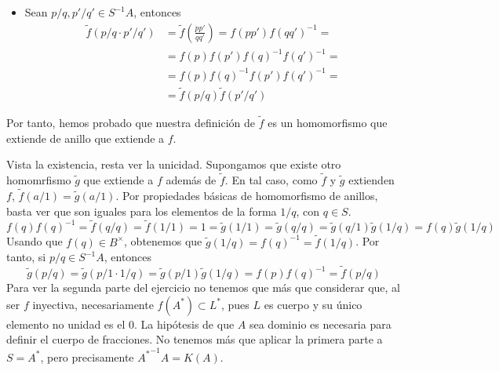 \documentclass[twoside]{article}
\begin{document}
\begin{ejercicio}{1}
\begin{solucion}
\begin{itemize}
\begin{itemize}
\item Sean $p/q,p'/q' \in S^{-1}A$, entonces
\begin{align*}
\tilde{f}(p/q\cdot p'/q') &= 	\tilde{f}\left(\frac{pp'}{qq'}\right) = f(pp')f(qq')^{-1} = \\
 &= f(p)f(p')f(q)^{-1}f(q')^{-1} = \\
 &= f(p)f(q)^{-1}f(p')f(q')^{-1} =\\
 &= \tilde{f}(p/q)\tilde{f}(p'/q')
\end{align*}
\end{itemize}
Por tanto, hemos probado que nuestra definición de $\tilde{f}$ es un homomorfismo que extiende de anillo que extiende a $f$.
\end{itemize}
Vista la existencia, resta ver la unicidad. Supongamos que existe otro homomrfismo $\tilde{g}$ que extiende a $f$ además de $\tilde{f}$. En tal caso, como $\tilde{f}$ y $\tilde{g}$ extienden $f$, $\tilde{f}(a/1)=\tilde{g}(a/1)$. Por propiedades básicas de homomorfismo de anillos, basta ver que son iguales para los elementos de la forma $1/q$, con $q\in S$.
$$
f(q)f(q)^{-1} = \tilde{f}(q/q)= \tilde{f}(1/1) = 1 =\tilde{g}(1/1) =\tilde{g}(q/q) =\tilde{g}(q/1)\tilde{g}(1/q)=f(q)\tilde{g}(1/q)
$$
Usando que $f(q)\in B^\times$, obtenemos que $\tilde{g}(1/q)=f(q)^{-1}=\tilde{f}(1/q)$. Por tanto, si ${p/q\in S^{-1}A}$, entonces 
$$
\tilde{g}(p/q) = \tilde{g}(p/1\cdot 1/q) = \tilde{g}(p/1)\tilde{g}(1/q) = f(p)f(q)^{-1} = \tilde{f}(p/q)
$$
Para ver la segunda parte del ejercicio no tenemos que más que considerar que, al ser $f$ inyectiva, necesariamente $f(A^*)\subset L^*$, pues $L$ es cuerpo y su único elemento no unidad es el $0$. La hipótesis de que $A$ sea dominio es necesaria para definir el cuerpo de fracciones. No tenemos más que aplicar la primera parte a $S=A^{*}$, pero precisamente ${A^*}^{-1}A = K(A)$. 
\end{solucion}
\end{ejercicio}

\newpage
\end{document}
